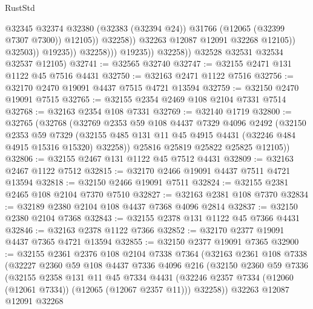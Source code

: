 \begin{lexlean}{RustStd}
\begin{coremodule}
                                        @32345
                                        @32374
                                        @32380
                                        (@32383 (@32394 @24))
                                        @31766
                                        (@12065 (@32399 @7307 @7300))
                                        @12105))
                                    @32258))
                                @32263
                                @12087
                                @12091
                                @32268
                                @12105))
                            @32503))
                        @19235))
                    @32258)))
              @19235))
          @32258))
      @32528
      @32531
      @32534
      @32537
      @12105)
@32741 := @32565 @32740
@32747 := @32155 @2471 @131 @1122 @45 @7516 @4431
@32750 := @32163 @2471 @1122 @7516
@32756 := @32170 @2470 @19091 @4437 @7515 @4721 @13594
@32759 := @32150 @2470 @19091 @7515
@32765 := @32155 @2354 @2469 @108 @2104 @7331 @7514
@32768 := @32163 @2354 @108 @7331
@32769 := @32140 @1719
@32800 := @32765
    (@32768
      (@32769
        @2353
        @59
        @108
        @4437
        @7329
        @4096
        @2492
        (@32150
          @2353
          @59
          @7329
          (@32155 @485 @131 @11 @45 @4915 @4431 (@32246 @484 @4915 @15316 @15320) @32258))
        @25816
        @25819
        @25822
        @25825
        @12105))
@32806 := @32155 @2467 @131 @1122 @45 @7512 @4431
@32809 := @32163 @2467 @1122 @7512
@32815 := @32170 @2466 @19091 @4437 @7511 @4721 @13594
@32818 := @32150 @2466 @19091 @7511
@32824 := @32155 @2381 @2465 @108 @2104 @7370 @7510
@32827 := @32163 @2381 @108 @7370
@32834 := @32189 @2380 @2104 @108 @4437 @7368 @4096 @2814
@32837 := @32150 @2380 @2104 @7368
@32843 := @32155 @2378 @131 @1122 @45 @7366 @4431
@32846 := @32163 @2378 @1122 @7366
@32852 := @32170 @2377 @19091 @4437 @7365 @4721 @13594
@32855 := @32150 @2377 @19091 @7365
@32900 := @32155
    @2361
    @2376
    @108
    @2104
    @7338
    @7364
    (@32163
      @2361
      @108
      @7338
      (@32227
        @2360
        @59
        @108
        @4437
        @7336
        @4096
        @216
        (@32150
          @2360
          @59
          @7336
          (@32155
            @2358
            @131
            @11
            @45
            @7334
            @4431
            (@32246 @2357 @7334 (@12060 (@12061 @7334)) (@12065 (@12067 @2357 @11)))
            @32258))
        @32263
        @12087
        @12091
        @32268

\end{coremodule}
\end{lexlean}

